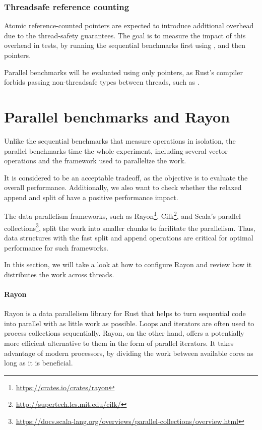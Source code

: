 \subsubsection*{Threadsafe reference counting}
Atomic reference-counted pointers are expected to introduce additional overhead due to the thread-safety guarantees. The goal is to measure the impact of this overhead in tests, by running the sequential benchmarks first using \rc{}, and then \arc{} pointers.

Parallel benchmarks will be evaluated using only \arc{} pointers, as Rust's compiler forbids passing non-threadsafe types between threads, such as \rc{}.

\section{Parallel benchmarks and Rayon}
Unlike the sequential benchmarks that measure operations in isolation, the parallel benchmarks time the whole experiment, including several vector operations and the framework used to parallelize the work.

It is considered to be an acceptable tradeoff, as the objective is to evaluate the overall performance. Additionally, we also want to check whether the relaxed append and split of \rrbvec{} have a positive performance impact.

The data parallelism frameworks, such as Rayon\footnote{\url{https://crates.io/crates/rayon}}, Cilk\footnote{\url{http://supertech.lcs.mit.edu/cilk/}}, and Scala's parallel collections\footnote{\url{https://docs.scala-lang.org/overviews/parallel-collections/overview.html}}, split the work into smaller chunks to facilitate the parallelism. Thus, data structures with the fast split and append operations are critical for optimal performance for such frameworks.

In this section, we will take a look at how to configure Rayon and review how it distributes the work across threads.

\paragraph{Rayon}
Rayon is a data parallelism library for Rust that helps to turn sequential code into parallel with as little work as possible. Loops and iterators are often used to process collections sequentially. Rayon, on the other hand, offers a potentially more efficient alternative to them in the form of parallel iterators. It takes advantage of modern processors, by dividing the work between available cores as long as it is beneficial.

